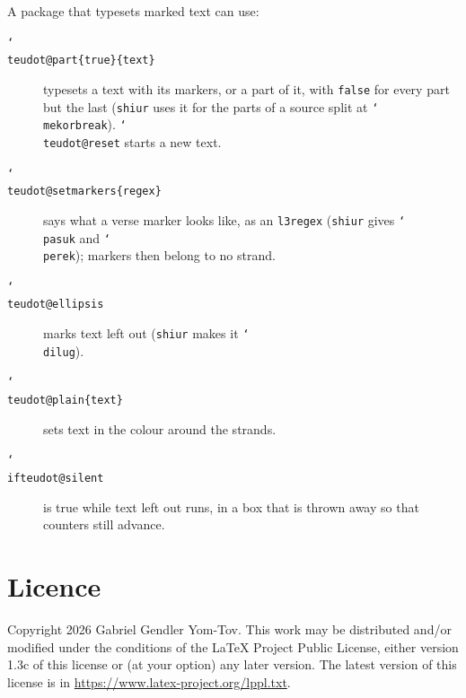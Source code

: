 \documentclass[11pt]{article}
\newcommand{\cs}[1]{\texttt{\char`\\#1}}
\begin{document}
A package that typesets marked text can use:
\begin{description}
\item[\cs{teudot@part}\texttt{\{true\}\{text\}}] typesets a text with its markers, or a part of
	it, with \texttt{false} for every part but the last (\texttt{shiur} uses it for the parts of a
	source split at \cs{mekorbreak}). \cs{teudot@reset} starts a new text.
\item[\cs{teudot@setmarkers}\texttt{\{regex\}}] says what a verse marker looks like, as an
	\texttt{l3regex} (\texttt{shiur} gives \cs{pasuk} and \cs{perek}); markers then belong to no
	strand.
\item[\cs{teudot@ellipsis}] marks text left out (\texttt{shiur} makes it \cs{dilug}).
\item[\cs{teudot@plain}\texttt{\{text\}}] sets text in the colour around the strands.
\item[\cs{ifteudot@silent}] is true while text left out runs, in a box that is thrown away so
	that counters still advance.
\end{description}

\section{Licence}

Copyright 2026 Gabriel Gendler Yom-Tov. This work may be distributed and/or modified under the
conditions of the \LaTeX{} Project Public License, either version 1.3c of this license or (at
your option) any later version. The latest version of this license is in
\url{https://www.latex-project.org/lppl.txt}.
\end{document}
